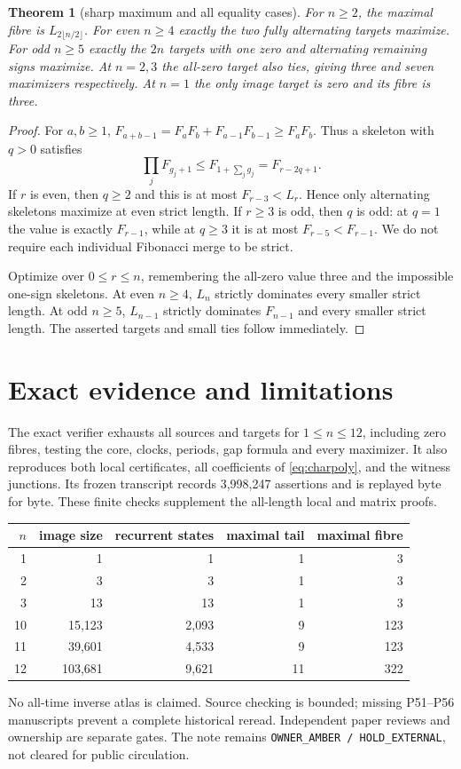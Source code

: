 \documentclass[a4paper,10pt]{amsart}
\newtheorem{theorem}{Theorem}[section]
\theoremstyle{remark}
\begin{document}
\begin{theorem}[sharp maximum and all equality cases]\label{thm:max}
For $n\ge2$, the maximal fibre is $L_{2\lfloor n/2\rfloor}$.
For even $n\ge4$ exactly the two fully alternating targets maximize.
For odd $n\ge5$ exactly the $2n$ targets with one zero and alternating
remaining signs maximize. At $n=2,3$ the all-zero target also ties, giving
three and seven maximizers respectively. At $n=1$ the only image target
is zero and its fibre is three.
\end{theorem}
\begin{proof}
For $a,b\ge1$, $F_{a+b-1}=F_aF_b+F_{a-1}F_{b-1}\ge F_aF_b$.
Thus a skeleton with $q>0$ satisfies
\begin{equation*}
\prod_jF_{g_j+1}\le F_{1+\sum_jg_j}=F_{r-2q+1}.
\end{equation*}
If $r$ is even, then $q\ge2$ and this is at most $F_{r-3}<L_r$.
Hence only alternating skeletons maximize at even strict length. If
$r\ge3$ is odd, then $q$ is odd: at $q=1$ the value is exactly
$F_{r-1}$, while at $q\ge3$ it is at most $F_{r-5}<F_{r-1}$.
We do not require each individual Fibonacci merge to be strict.

Optimize over $0\le r\le n$, remembering the all-zero value three and
the impossible one-sign skeletons. At even $n\ge4$, $L_n$ strictly
dominates every smaller strict length. At odd $n\ge5$, $L_{n-1}$
strictly dominates $F_{n-1}$ and every smaller strict length. The asserted
targets and small ties follow immediately.
\end{proof}

\section{Exact evidence and limitations}
The exact verifier exhausts all sources and targets for $1\le n\le12$,
including zero fibres, testing the core, clocks, periods, gap formula and
every maximizer. It also reproduces both local certificates, all
coefficients of \eqref{eq:charpoly}, and the witness junctions. Its frozen
transcript records 3,998,247 assertions and is replayed byte for byte.
These finite checks supplement the all-length local and matrix proofs.

\begin{center}
\begin{tabular}{r|r r r r}
$n$ & image size & recurrent states & maximal tail & maximal fibre\\\hline
1&1&1&1&3\\2&3&3&1&3\\3&13&13&1&3\\
10&15,123&2,093&9&123\\11&39,601&4,533&9&123\\
12&103,681&9,621&11&322
\end{tabular}
\end{center}
No all-time inverse atlas is claimed. Source checking is bounded; missing
P51--P56 manuscripts prevent a complete historical reread. Independent
paper reviews and ownership are separate gates. The note remains
\texttt{OWNER\_AMBER / HOLD\_EXTERNAL}, not cleared for public circulation.


\end{document}
